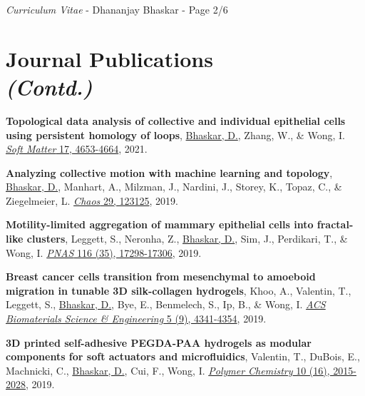 \documentclass[margin,line]{res}
\begin{document}
\begin{resume}
\newpage
\begin{flushright}
\textit{Curriculum Vitae} - Dhananjay Bhaskar - Page 2/6
\end{flushright}
\vspace*{.15cm}

\section{\sc Journal Publications \\ \textit{(Contd.)}}
{
\renewcommand\leftmargini{0em}
\renewcommand{\labelenumi}{J\theenumi}
\begin{etaremune}[start=7]
\item{\bf Topological data analysis of collective and individual epithelial cells using persistent homology of loops}, 
\underline{Bhaskar, D.}, Zhang, W., \& Wong, I. 
\href{https://doi.org/10.1039/D1SM00072A}{\textit{Soft Matter} 17, 4653-4664}, 2021.
\vspace*{.1cm}
\item{\bf Analyzing collective motion with machine learning and topology}, 
\underline{Bhaskar, D.}, Manhart, A., Milzman, J., Nardini, J., Storey, K., Topaz, C., \& Ziegelmeier, L. 
\href{https://aip.scitation.org/doi/10.1063/1.5125493}{\textit{Chaos} 29, 123125}, 2019.
\vspace*{.1cm}
\item{\bf Motility-limited aggregation of mammary epithelial cells into fractal-like clusters}, 
Leggett, S., Neronha, Z., \underline{Bhaskar, D.}, Sim, J., Perdikari, T., \& Wong, I. 
\href{https://www.pnas.org/content/116/35/17298.short}{\textit{PNAS} 116 (35), 17298-17306}, 2019.
\vspace*{.05cm}
\item{\bf Breast cancer cells transition from mesenchymal to amoeboid migration in tunable 3D silk-collagen hydrogels},
Khoo, A., Valentin, T., Leggett, S., \underline{Bhaskar, D.}, Bye, E., Benmelech, S., Ip, B., \& Wong, I. 
\href{https://pubs.acs.org/doi/abs/10.1021/acsbiomaterials.9b00519}{\textit{ACS Biomaterials Science \& Engineering} 5 (9), 4341-4354}, 2019.
\vspace*{.1cm}
\item{\bf 3D printed self-adhesive PEGDA-PAA hydrogels as modular components for soft actuators and microfluidics}, 
Valentin, T., DuBois, E., Machnicki, C., \underline{Bhaskar, D.}, Cui, F., Wong, I. 
\href{https://pubs.rsc.org/ko/content/articlehtml/2019/py/c9py00211a}{\textit{Polymer Chemistry} 10 (16), 2015-2028}, 2019.

\end{etaremune}}
\end{resume}
\end{document}
